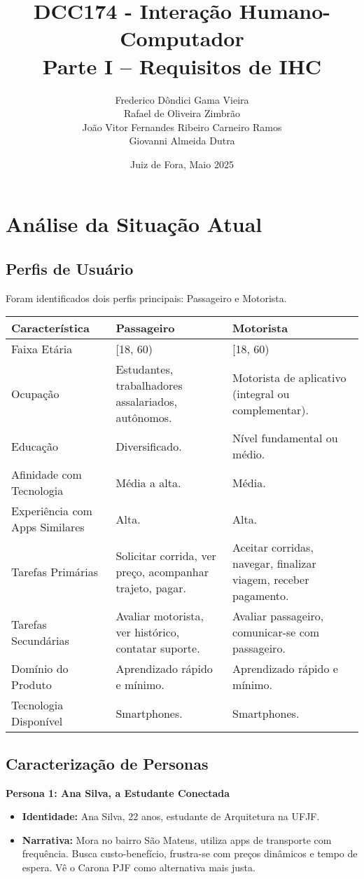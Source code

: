 \documentclass[12pt,a4paper]{article}
\title{\textbf{DCC174 - Interação Humano-Computador \\ Parte I – Requisitos de IHC}}
\author{Frederico Dôndici Gama Vieira \\ Rafael de Oliveira Zimbrão \\ João Vitor Fernandes Ribeiro Carneiro Ramos \\ Giovanni Almeida Dutra}
\date{Juiz de Fora, Maio 2025}
\begin{document}
\maketitle

\section{Análise da Situação Atual}

\subsection{Perfis de Usuário}

Foram identificados dois perfis principais: Passageiro e Motorista.

\begin{longtable}{|p{4cm}|p{5cm}|p{5cm}|}
\hline
\textbf{Característica} & \textbf{Passageiro} & \textbf{Motorista} \\
\hline
Faixa Etária & [18, 60) & [18, 60) \\
\hline
Ocupação & Estudantes, trabalhadores assalariados, autônomos. & Motorista de aplicativo (integral ou complementar). \\
\hline
Educação & Diversificado. & Nível fundamental ou médio. \\
\hline
Afinidade com Tecnologia & Média a alta. & Média. \\
\hline
Experiência com Apps Similares & Alta. & Alta. \\
\hline
Tarefas Primárias & Solicitar corrida, ver preço, acompanhar trajeto, pagar. & Aceitar corridas, navegar, finalizar viagem, receber pagamento. \\
\hline
Tarefas Secundárias & Avaliar motorista, ver histórico, contatar suporte. & Avaliar passageiro, comunicar-se com passageiro. \\
\hline
Domínio do Produto & Aprendizado rápido e mínimo. & Aprendizado rápido e mínimo. \\
\hline
Tecnologia Disponível & Smartphones. & Smartphones. \\
\hline
\end{longtable}

\subsection{Caracterização de Personas}

\textbf{Persona 1: Ana Silva, a Estudante Conectada}
\begin{itemize}
    \item \textbf{Identidade:} Ana Silva, 22 anos, estudante de Arquitetura na UFJF.
    \item \textbf{Narrativa:} Mora no bairro São Mateus, utiliza apps de transporte com frequência. Busca custo-benefício, frustra-se com preços dinâmicos e tempo de espera. Vê o Carona PJF como alternativa mais justa.
\end{itemize}
\end{document}
